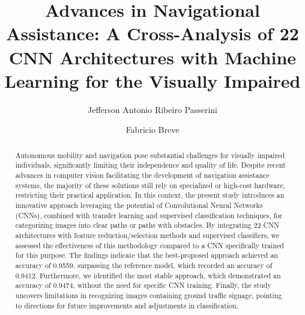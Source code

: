 \documentclass[preprint,12pt,authoryear]{elsarticle}
\begin{document}
\begin{frontmatter}



\title{Advances in Navigational Assistance: A Cross-Analysis of 22 CNN Architectures with Machine Learning for the Visually Impaired}


\author{Jefferson Antonio Ribeiro Passerini}
\author{Fabricio Breve}
\address{Institute of Geosciences and Exact Sciences,
	S\~{a}o Paulo State University (UNESP), Rio Claro, SP, 13506-900, Brazil}

\begin{abstract}
Autonomous mobility and navigation pose substantial challenges for visually impaired individuals, significantly limiting their independence and quality of life. Despite recent advances in computer vision facilitating the development of navigation assistance systems, the majority of these solutions still rely on specialized or high-cost hardware, restricting their practical application. In this context, the present study introduces an innovative approach leveraging the potential of Convolutional Neural Networks (CNNs), combined with transfer learning and supervised classification techniques, for categorizing images into clear paths or paths with obstacles. By integrating 22 CNN architectures with feature reduction/selection methods and supervised classifiers, we assessed the effectiveness of this methodology compared to a CNN specifically trained for this purpose. The findings indicate that the best-proposed approach achieved an accuracy of 0.9559, surpassing the reference model, which recorded an accuracy of 0.9412. Furthermore, we identified the most stable approach, which demonstrated an accuracy of 0.9474, without the need for specific CNN training. Finally, the study uncovers limitations in recognizing images containing ground traffic signage, pointing to directions for future improvements and adjustments in classification.
\end{abstract}


\end{frontmatter}
\end{document}
